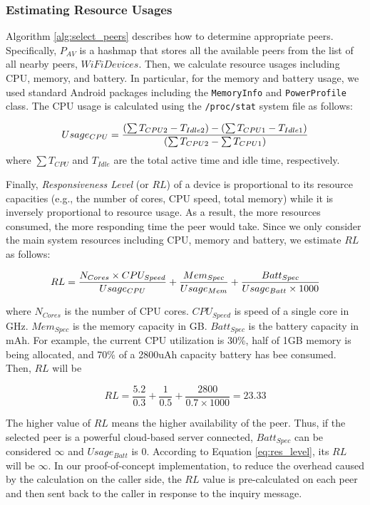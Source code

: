\documentclass{sig-alternate}
\begin{document}
\subsubsection{Estimating Resource Usages}
Algorithm \ref{alg:select_peers} describes how to determine appropriate peers. Specifically, $P_{AV}$ is a hashmap that stores all the available peers from the list of all nearby peers, $WiFiDevices$. Then, we calculate resource usages including CPU, memory, and battery. In particular, for the memory and battery usage, we used standard Android packages including the \texttt{MemoryInfo} and \texttt{PowerProfile} class. The CPU usage is calculated using the \texttt{/proc/stat} system file as follows:

\begin{equation} 
\label{eq:cpu_usage} \small
Usage_{CPU} = \frac{(\sum{T_{CPU2}} - T_{Idle2}) - (\sum{T_{CPU1}} - T_{Idle1})}{(\sum{T_{CPU2}} - \sum{T_{CPU1}})}
\end{equation}
\noindent
where $\sum{T_{CPU}}$ and $T_{Idle}$ are the total active time and idle time, respectively.


Finally, \emph{Responsiveness Level} (or $RL$) of a device is proportional to its resource capacities (e.g., the number of cores, CPU speed, total memory) while it is inversely proportional to resource usage. As a result, the more resources consumed, the more responding time the peer would take. Since we only consider the main system resources including CPU, memory and battery, we estimate $RL$ as follows:

\begin{equation}
\label{eq:res_level}
\small
RL = \frac{N_{Cores} \times CPU_{Speed}}{Usage_{CPU}} + \frac{Mem_{Spec}}{Usage_{Mem}} + \frac{Batt_{Spec}}{Usage_{Batt} \times 1000}
\end{equation}

\noindent where $N_{Cores}$ is the number of CPU cores. $CPU_{Speed}$ is speed of a single core in GHz. $Mem_{Spec}$ is the memory capacity in GB. $Batt_{Spec}$ is the battery capacity in mAh. For example, the current CPU utilization is 30\%, half of 1GB memory is being allocated, and 70\% of a 2800uAh capacity battery has bee consumed. Then, $RL$ will be 

\begin{small} $$RL = \frac{5.2}{0.3} + \frac{1}{0.5} + \frac{2800}{0.7 \times 1000} = 23.33$$ \end{small}

The higher value of $RL$ means the higher availability of the peer. Thus, if the selected peer is a powerful cloud-based server connected, $Batt_{Spec}$ can be considered $\infty$ and $Usage_{Batt}$ is 0. According to Equation \ref{eq:res_level}, its $RL$ will be $\infty$. In our proof-of-concept implementation, to reduce the overhead caused by the calculation on the caller side, the $RL$ value is pre-calculated on each peer and then sent back to the caller in response to the inquiry message.
\end{document}
